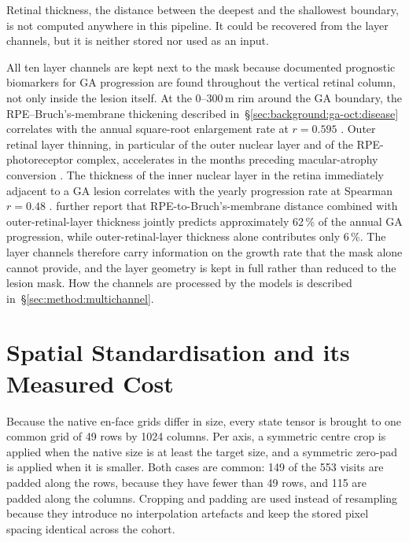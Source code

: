 
Retinal thickness, the distance between the deepest and the shallowest
boundary, is not computed anywhere in this pipeline. It could be
recovered from the layer channels, but it is neither stored nor used as
an input.

All ten layer channels are kept next to the mask because documented
prognostic biomarkers for GA progression are found throughout the
vertical retinal column, not only inside the lesion itself.
At the 0--300\,\textmu{}m rim around the GA boundary, the
RPE--Bruch's-membrane thickening described
in~\S\ref{sec:background:ga-oct:disease} correlates with the annual
square-root enlargement rate at $r = 0.595$ \citep{Chu2022}. Outer retinal
layer thinning, in particular of the outer nuclear layer and of the
RPE-photoreceptor complex, accelerates in the months preceding
macular-atrophy conversion \citep{Vogl2021}. The thickness of the inner
nuclear layer in the retina immediately adjacent to a GA lesion correlates
with the yearly progression rate at Spearman $r = 0.48$
\citep{Ebneter2016}. \citet{Vallino2024} further report that
RPE-to-Bruch's-membrane distance combined with outer-retinal-layer
thickness jointly predicts approximately 62\,\% of the annual GA
progression, while outer-retinal-layer thickness alone contributes only
6\,\%. The layer channels therefore carry information on the growth
rate that the mask alone cannot provide, and the layer geometry is kept
in full rather than reduced to the lesion mask. How the channels are
processed by the models is described in~\S\ref{sec:method:multichannel}.


\section{Spatial Standardisation and its Measured Cost}
\label{sec:data:spatial}

Because the native en-face grids differ in size, every state tensor is
brought to one common grid of 49 rows by 1024 columns. Per axis, a
symmetric centre crop is applied when the native size is at least the
target size, and a symmetric zero-pad is applied when it is smaller.
Both cases are common: 149 of the 553 visits are padded along the rows,
because they have fewer than 49 rows, and 115 are padded along the
columns. Cropping and padding are used instead of resampling because they
introduce no interpolation artefacts and keep the stored pixel spacing
identical across the cohort.

